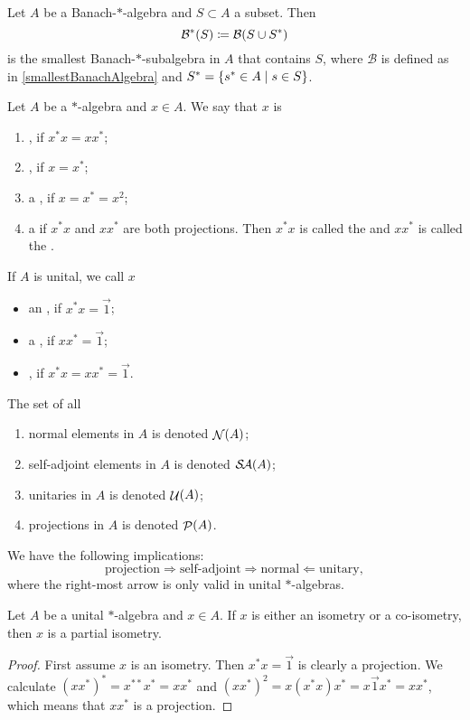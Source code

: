 \begin{proposition} \label{smallestBanach*Algebra}
Let $A$ be a Banach-$*$-algebra and $S\subset A$ a subset. Then
\[ \mathcal{B}^*(S) \coloneqq \mathcal{B}(S\cup S^*) \]
is the smallest Banach-$*$-subalgebra in $A$ that contains $S$, where $\mathcal{B}$ is defined as in \ref{smallestBanachAlgebra} and $S^* = \setbuilder{s^*\in A}{s\in S}$.
\end{proposition}

\begin{definition}
Let $A$ be a $*$-algebra and $x\in A$. We say that $x$ is
\begin{enumerate}
\item {}, if $x^*x = xx^*$;
\item {}, if $x=x^*$;
\item a , if $x=x^*=x^2$;
\item a  if $x^*x$ and $xx^*$ are both projections. Then $x^*x$ is called the  and $xx^*$ is called the .
\end{enumerate}
If $A$ is unital, we call $x$
\begin{itemize}
\item an , if $x^*x = \vec{1}$;
\item a , if $xx^* = \vec{1}$;
\item {}, if $x^*x = xx^* = \vec{1}$.
\end{itemize}
The set of all
\begin{enumerate}
\item normal elements in $A$ is denoted $\mathop{\mathcal{N}}\nolimits(A)$;
\item self-adjoint elements in $A$ is denoted $\mathop{\mathcal{S}\hspace{-0.15em}\mathcal{A}}\nolimits(A)$;
\item unitaries in $A$ is denoted $\mathop{\mathcal{U}}\nolimits(A)$;
\item projections in $A$ is denoted $\mathop{\mathcal{P}}\nolimits(A)$.
\end{enumerate}
\end{definition}
\begin{lemma}
We have the following implications:
\[ \text{projection} \Rightarrow \text{self-adjoint} \Rightarrow \text{normal} \Leftarrow \text{unitary}, \]
where the right-most arrow is only valid in unital $*$-algebras.
\end{lemma}

\begin{lemma}
Let $A$ be a unital $*$-algebra and $x\in A$. If $x$ is either an isometry or a co-isometry, then $x$ is a partial isometry.
\end{lemma}
\begin{proof}
First assume $x$ is an isometry. Then $x^*x = \vec{1}$ is clearly a projection. We calculate $(xx^*)^* = x^{**}x^* = xx^*$ and $(xx^*)^2 = x(x^*x)x^* = x\vec{1}x^* = xx^*$, which means that $xx^*$ is a projection.
\end{proof}


